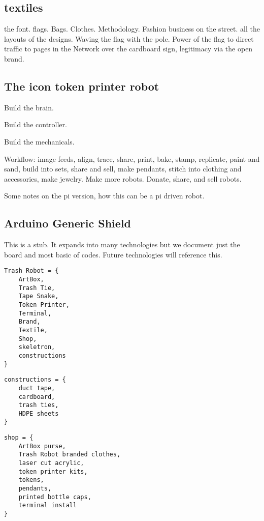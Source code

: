 \subsection{textiles}

the font. flags. Bags. Clothes.  Methodology. Fashion business on the street. all the layouts of the designs.  Waving the flag with the pole. Power of the flag to direct traffic to pages in the Network over the cardboard sign, legitimacy via the open brand.

\subsection{The icon token printer robot}

Build the brain. 

Build the controller. 

Build the mechanicals.  

Workflow:  image feeds, align, trace, share, print, bake, stamp, replicate, paint and sand, build into sets, share and sell, make pendants, stitch into clothing and accessories, make jewelry. Make more robots. Donate, share, and sell robots.

Some notes on the pi version, how this can be a pi driven robot.

\subsection{Arduino Generic Shield}

This is a stub.  It expands into many technologies but we document just the board and most basic of codes.  Future technologies will reference this.

\begin{verbatim}
Trash Robot = {
    ArtBox,
    Trash Tie,
    Tape Snake,
    Token Printer,
    Terminal,
    Brand,
    Textile,
    Shop,
    skeletron,
    constructions
}
\end{verbatim}
    
\begin{verbatim}
constructions = {
    duct tape, 
    cardboard, 
    trash ties, 
    HDPE sheets
}
\end{verbatim}
\begin{verbatim}
shop = {
    ArtBox purse, 
    Trash Robot branded clothes, 
    laser cut acrylic, 
    token printer kits,
    tokens,
    pendants,
    printed bottle caps,
    terminal install
}
\end{verbatim}

